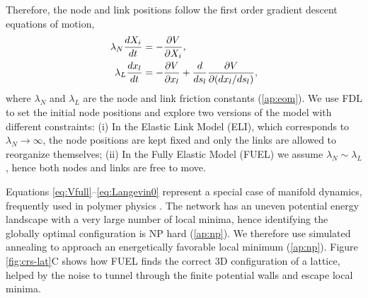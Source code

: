 \documentclass[nofootinbib,preprint,floatfix,titlepage,superscriptaddress]{revtex4} %
\begin{document}
Therefore, the node and link positions follow the first order gradient descent equations of motion, 
\begin{align}
    \lambda_N {dX_i\over dt} &= -{\ro V \over \ro X_i} %
    \label{eq:nodes},\\
    \lambda_L {dx_l \over dt} & =  -{\ro V \over \ro x_l} + {d\over ds_l} {\ro V \over \ro (dx_l /ds_l)}   \label{eq:Langevin0},
\end{align}
where $\lambda_N$ and $\lambda_L$ are the node and link friction constants (\ref{ap:eom}). 
We use FDL to set the initial node positions and explore two versions of the model with different constraints: 
(i) In the Elastic Link Model (ELI), which corresponds to $\lambda_N\to \infty$, the node positions are kept fixed and only the links are allowed to reorganize themselves; 
(ii) In the Fully Elastic Model (FUEL) we assume $\lambda_N \sim \lambda_L$, hence both nodes and links are free to move. 

Equations \eqref{eq:Vfull}--\eqref{eq:Langevin0} represent a special case of manifold dynamics, frequently used in polymer physics \cite{mezard1991replica}. 
The network has an uneven potential energy landscape \cite{bouchaud1998out} %
with a very large number of local minima, hence identifying the globally optimal configuration is NP hard (\ref{ap:np}).
We therefore use simulated annealing \cite{kirkpatrick1987optimization} %
to approach an energetically favorable local minimum (\ref{ap:np}). 
Figure \ref{fig:crs-lat}C shows how FUEL finds the correct 3D configuration of a lattice, %
helped by the noise to tunnel through the finite potential walls and escape local minima. 
\end{document}
